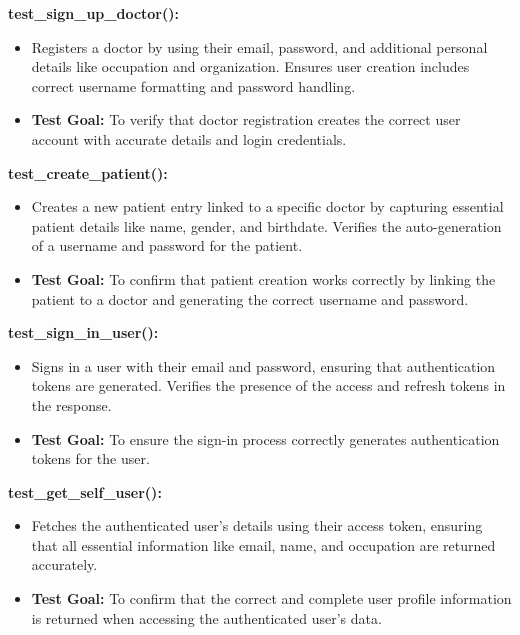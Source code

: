 \documentclass[12pt, titlepage]{article}
\begin{document}
\begin{enumerate}
\begin{enumerate}
\begin{enumerate}
\begin{enumerate}
\textbf{test\_sign\_up\_doctor():}  
\begin{itemize}
    \item Registers a doctor by using their email, password, and additional personal details like occupation and organization. Ensures user creation includes correct username formatting and password handling.
    \item \textbf{Test Goal:} To verify that doctor registration creates the correct user account with accurate details and login credentials. 
    \newline
\end{itemize}

\textbf{test\_create\_patient():}  
\begin{itemize}
    \item Creates a new patient entry linked to a specific doctor by capturing essential patient details like name, gender, and birthdate. Verifies the auto-generation of a username and password for the patient.
    \item \textbf{Test Goal:} To confirm that patient creation works correctly by linking the patient to a doctor and generating the correct username and password. 
    \newline
\end{itemize}

\textbf{test\_sign\_in\_user():}  
\begin{itemize}
    \item Signs in a user with their email and password, ensuring that authentication tokens are generated. Verifies the presence of the access and refresh tokens in the response.
    \item \textbf{Test Goal:} To ensure the sign-in process correctly generates authentication tokens for the user. 
    \newline
\end{itemize}

\textbf{test\_get\_self\_user():}  
\begin{itemize}
    \item Fetches the authenticated user's details using their access token, ensuring that all essential information like email, name, and occupation are returned accurately.
    \item \textbf{Test Goal:} To confirm that the correct and complete user profile information is returned when accessing the authenticated user's data. 
    \newline
\end{itemize}


\end{enumerate}
\end{enumerate}
\end{enumerate}
\end{enumerate}
\end{document}
